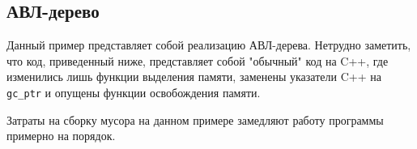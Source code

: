 \subsection{АВЛ-дерево}
Данный пример представляет собой реализацию АВЛ-дерева.
Нетрудно заметить, что код, приведенный ниже, представляет собой "обычный" код на C++, где
изменились лишь функции выделения памяти, заменены указатели C++ на \lstinline[language= cpp]{gc_ptr}
и опущены функции освобождения памяти.



Затраты на сборку мусора на данном примере замедляют работу программы примерно на порядок.